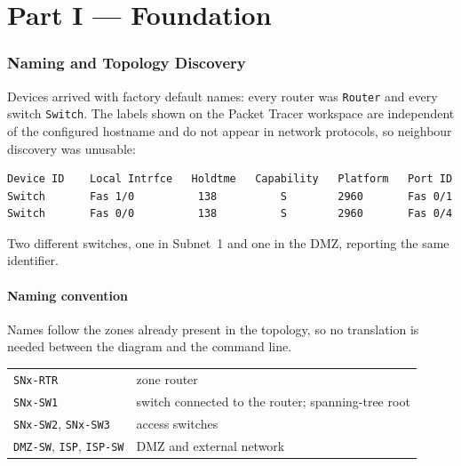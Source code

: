 \documentclass[12pt,a4paper]{article}
\begin{document}
\newpage
\part*{Part I --- Foundation}

\section{Naming and Topology Discovery}

Devices arrived with factory default names: every router was \texttt{Router} and
every switch \texttt{Switch}. The labels shown on the Packet Tracer workspace are
independent of the configured hostname and do not appear in network protocols, so
neighbour discovery was unusable:

\begin{lstlisting}
Device ID    Local Intrfce   Holdtme   Capability   Platform   Port ID
Switch       Fas 1/0          138          S        2960       Fas 0/1
Switch       Fas 0/0          138          S        2960       Fas 0/4
\end{lstlisting}

Two different switches, one in Subnet~1 and one in the DMZ, reporting the same
identifier.

\subsection{Naming convention}

Names follow the zones already present in the topology, so no translation is
needed between the diagram and the command line.

\begin{table}[H]
\centering
\begin{tabular}{@{} l l @{}}
\toprule
\texttt{SNx-RTR} & zone router \\
\texttt{SNx-SW1} & switch connected to the router; spanning-tree root \\
\texttt{SNx-SW2}, \texttt{SNx-SW3} & access switches \\
\texttt{DMZ-SW}, \texttt{ISP}, \texttt{ISP-SW} & DMZ and external network \\
\bottomrule
\end{tabular}
\end{table}
\end{document}

